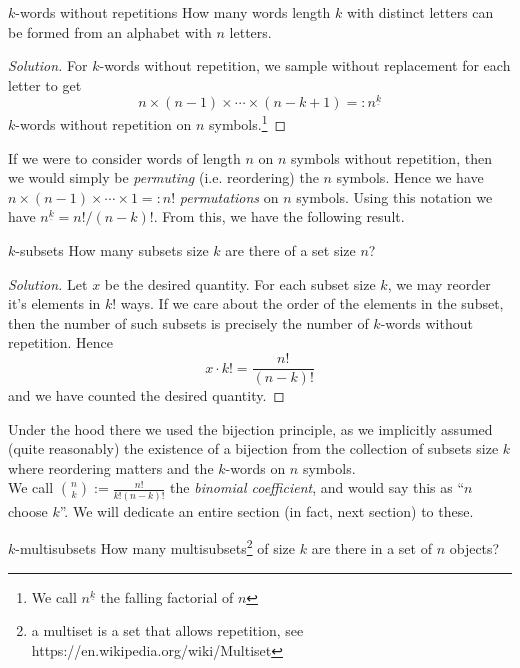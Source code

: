 \documentclass{article}
\begin{document}
\begin{problem}[]{$k$-words without repetitions}
    How many words length $k$ with distinct letters can be formed from an alphabet with $n$ letters. 
\end{problem}

\begin{proof}[Solution]
    For $k$-words without repetition, we sample without replacement for each letter to get
    \[n \times (n-1) \times \cdots \times (n-k+1) =: n^{\underline{k}}\]
    $k$-words without repetition on $n$ symbols.\footnote{We call $n^{\underline{k}}$ the falling factorial of $n$}
\end{proof}

If we were to consider words of length $n$ on $n$ symbols without repetition, then we would simply be {\it permuting} (i.e. reordering) the 
$n$ symbols. Hence we have $n \times (n-1) \times \cdots \times 1 =: n!$ {\it permutations} on $n$ symbols. Using this notation we have 
$n^{\underline{k}} = n!/(n-k)!$. From this, we have the following result.

\begin{problem}[]{$k$-subsets}
    How many subsets size $k$ are there of a set size $n$?
\end{problem}

\begin{proof}[Solution]
    Let $x$ be the desired quantity. For each subset size $k$, we may reorder it's elements in $k!$ ways. If we care about the order of the elements 
    in the subset, then the number of such subsets is precisely the number of $k$-words without repetition. Hence \[x \cdot k! = \frac{n!}{(n-k)!}\]
    and we have counted the desired quantity.
\end{proof}

Under the hood there we used the bijection principle, as we implicitly assumed (quite reasonably) the existence of a bijection from the 
collection of subsets size $k$ where reordering matters and the $k$-words on $n$ symbols. \\

We call $\binom{n}{k} := \frac{n!}{k!(n-k)!}$ the {\it binomial coefficient}, and would say this as ``$n$ choose $k$''. We will dedicate an 
entire section (in fact, next section) to these. \\ 

\begin{problem}[]{$k$-multisubsets}
    How many multisubsets\footnote{a multiset is a set that allows repetition, see https://en.wikipedia.org/wiki/Multiset} of size $k$ are there
    in a set of $n$ objects?
\end{problem}
\end{document}
